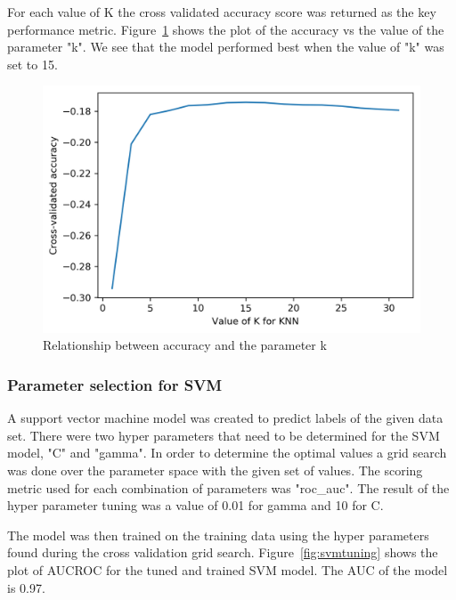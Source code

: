 For each value of K the cross validated accuracy score was returned as the key performance metric. Figure~\ref{fig:knntuning} shows the plot of the accuracy vs the value  of the parameter "k". We see that the model performed best when the value of "k" was set to 15.

\clearpage{}
\begin{figure}[!ht]
 \centering
\includegraphics[width=6.1in]{assignment2/2-2-a-kNN.png}
\caption{\label{fig:knntuning} Relationship between accuracy and the parameter k }
\end{figure}



\subsubsection{Parameter selection for SVM}

A support vector machine model was created to predict labels of the given data set. There were two hyper parameters that need to be determined for the SVM model, "C" and "gamma". In order to determine the optimal values a grid search was done over the parameter space with the given set of values. The scoring metric used for each combination of parameters was "roc_auc". The result of the hyper parameter tuning was a value of 0.01 for gamma and 10 for C.

The model was then trained on the training data using the hyper parameters found during the cross validation grid search. Figure~\ref{fig:svmtuning} shows the plot of AUCROC for the tuned and trained SVM model. The AUC of the model is 0.97.


